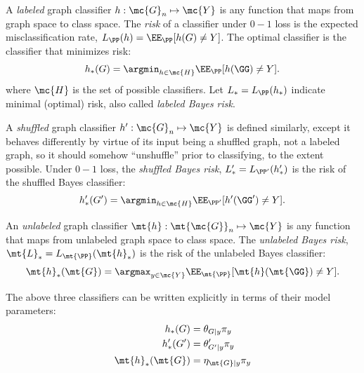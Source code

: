 \documentclass[10pt,journal,cspaper,compsoc]{IEEEtran}
\begin{document}


A \emph{labeled} graph classifier $h: \mc{G}_n \mapsto \mc{Y}$ is any function that maps from graph space to class space.  The \emph{risk} of a classifier under $0-1$ loss is the expected misclassification rate, $L_{\PP}(h)=\EE_{\PP}[h(G)\neq Y]$.  The optimal classifier is the classifier that minimizes risk:
\begin{align}
	h_*(G) = \argmin_{h \in \mc{H}} \EE_{\PP}[h(\GG) \neq Y].
\end{align}
where $\mc{H}$ is the set of possible classifiers.  Let $L_*=L_{\PP}(h_*)$ indicate minimal (optimal) risk, also called \emph{labeled Bayes risk}.  

A \emph{shuffled} graph classifier $h': \mc{G}_n \mapsto \mc{Y}$ is defined similarly, except it behaves differently by virtue of its input being a shuffled graph, not a labeled graph, so it should somehow ``unshuffle'' prior to classifying, to the extent possible.  Under $0-1$ loss, the \emph{shuffled Bayes risk}, $L'_*=L_{\PP'}(h'_*)$ is the risk of the shuffled Bayes classifier:
\begin{align}
	h_*'(G') = \argmin_{h \in \mc{H}} \EE_{\PP'}[h'(\GG') \neq Y].
\end{align}

An \emph{unlabeled} graph classifier $\mt{h}: \mt{\mc{G}}_n \mapsto \mc{Y}$ is any function that maps from unlabeled graph space to class space.  The \emph{unlabeled Bayes risk}, $\mt{L}_*=L_{\mt{\PP}}(\mt{h}_*)$ is the risk of the unlabeled Bayes classifier:
\begin{align} \label{eq:unbayes}
	 \mt{h}_*(\mt{G}) = \argmax_{y \in \mc{Y}} \EE_{\mt{\PP}}[\mt{h}(\mt{\GG}) \neq Y].
\end{align}

The above three classifiers can be written explicitly in terms of their model parameters:
\begin{align}
	h_*(G) &= \theta_{G|y}\pi_y \\
	h_*'(G') &= \theta_{G'|y}' \pi_y \\
	\mt{h}_*(\mt{G}) &= \eta_{\mt{G}|y}\pi_y
\end{align}
\end{document}
